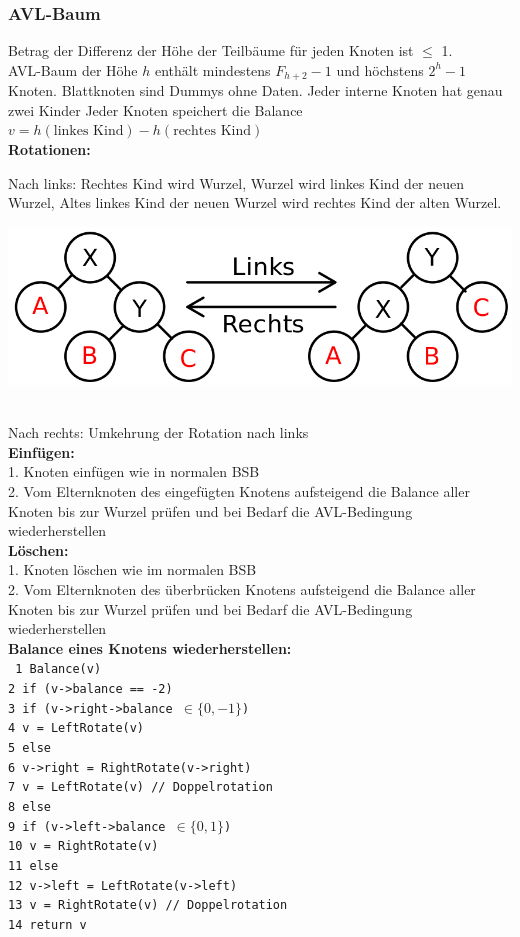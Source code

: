 \documentclass[fs, footer]{latex4ei}
\renewcommand{\t}{\texttt}
\begin{document}
\begin{multicols*}{4}
{{\subsubsection{AVL-Baum}
Betrag der Differenz der Höhe der Teilbäume für jeden Knoten ist $\leq$ 1.\\
AVL-Baum der Höhe $h$ enthält mindestens $F_{h+2}-1$ und höchstens $2^h - 1$ Knoten.
Blattknoten sind Dummys ohne Daten. Jeder interne Knoten hat genau zwei Kinder
Jeder Knoten speichert die Balance $v = h(\text{linkes Kind}) - h(\text{rechtes Kind})$\\
\textbf{Rotationen:}\\
\parbox{.5\linewidth}{
Nach links: Rechtes Kind wird Wurzel, Wurzel wird linkes Kind der neuen Wurzel, Altes linkes Kind der neuen Wurzel wird rechtes Kind der alten Wurzel.}\parbox{.5\linewidth}{\vspace{-.3cm}
\includegraphics[width=\linewidth]{img/avl-rotate}}\\
Nach rechts: Umkehrung der Rotation nach links\\
\textbf{Einfügen:}\\
1. Knoten einfügen wie in normalen BSB\\
2. Vom Elternknoten des eingefügten Knotens aufsteigend die Balance aller Knoten bis zur Wurzel prüfen und bei Bedarf die AVL-Bedingung wiederherstellen\\
\textbf{Löschen:}\\
1. Knoten löschen wie im normalen BSB\\
2. Vom Elternknoten des überbrücken Knotens aufsteigend die Balance aller Knoten bis zur Wurzel prüfen und bei Bedarf die AVL-Bedingung wiederherstellen\\
\textbf{Balance eines Knotens wiederherstellen:}\\
\t{
 1\ Balance(v)\\
 2\ if (v->balance == -2)\\
 3\ \quad if (v->right->balance $\in \{0, -1\}$)\\
 4\ \qquad   v = LeftRotate(v)\\
 5\ \quad else\\
 6\ \qquad   v->right = RightRotate(v->right)\\
 7\ \qquad   v = LeftRotate(v) // Doppelrotation\\
 8\ else\\
 9\ \quad if (v->left->balance $\in \{0, 1\}$)\\
10\ \qquad   v = RightRotate(v)\\
11\ \quad else\\
12\ \qquad   v->left = LeftRotate(v->left)\\
13\ \qquad   v = RightRotate(v) // Doppelrotation\\
14\ return v
}

}}
\end{multicols*}
\end{document}
